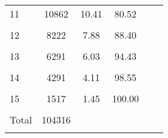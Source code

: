 \begin{table}
\begin{tabular}{l*{5}{c}}
    11          &       10862  & 10.41   &    80.52      \\
                &                     \\
    
    12          &        8222    &7.88    &   88.40     \\
                &                     \\
    
    13          &        6291  &6.03  &     94.43       \\
                &                     \\
    
    14          &        4291  &  4.11  &     98.55     \\
                &                     \\
    
    15          &        1517   & 1.45 &     100.00      \\
                &                     \\
    \hline
    Total       &      104316         \\
                &                     \\
    
    
    \end{tabular}
    \end{table}